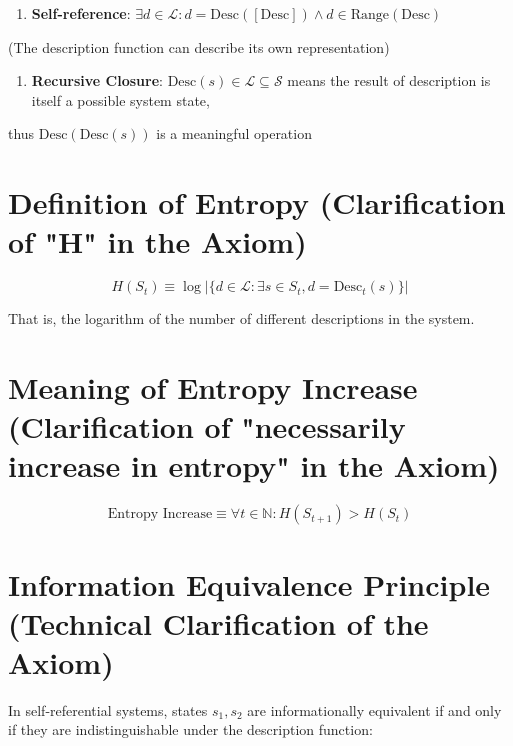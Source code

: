 \begin{enumerate}
\item \textbf{Self-reference}: $\exists d \in \mathcal{L}: d = \text{Desc}([\text{Desc}]) \land d \in \text{Range}(\text{Desc})$
\end{enumerate}
  (The description function can describe its own representation)

\begin{enumerate}
\item \textbf{Recursive Closure}: $\text{Desc}(s) \in \mathcal{L} \subseteq \mathcal{S}$ means the result of description is itself a possible system state,
\end{enumerate}
  thus $\text{Desc}(\text{Desc}(s))$ is a meaningful operation

\section{Definition of Entropy (Clarification of "H" in the Axiom)}
\label{sec:ch01_axiom_and_derivation:definition-of-entropy-clarification-of-h-in-the-axiom}

\begin{equation}
H(S_t) \equiv \log |\{d \in \mathcal{L}: \exists s \in S_t, d = \text{Desc}_t(s)\}|
\end{equation}

That is, the logarithm of the number of different descriptions in the system.

\section{Meaning of Entropy Increase (Clarification of "necessarily increase in entropy" in the Axiom)}
\label{sec:ch01_axiom_and_derivation:meaning-of-entropy-increase-clarification-of-necessarily-increase-in-entropy-in-the-axiom}

\begin{equation}
\text{Entropy Increase} \equiv \forall t \in \mathbb{N}: H(S_{t+1}) > H(S_t)
\end{equation}

\section{Information Equivalence Principle (Technical Clarification of the Axiom)}
\label{sec:ch01_axiom_and_derivation:information-equivalence-principle-technical-clarification-of-the-axiom}

In self-referential systems, states $s_1, s_2$ are informationally equivalent if and only if they are indistinguishable under the description function:

